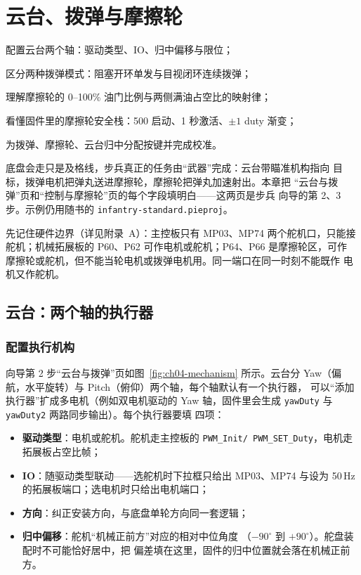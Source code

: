 \chapter{云台、拨弹与摩擦轮}
\label{ch:gimbal}

\begin{introduction}
  \item 配置云台两个轴：驱动类型、IO、归中偏移与限位；
  \item 区分两种拨弹模式：阻塞开环单发与目视闭环连续拨弹；
  \item 理解摩擦轮的 0--100\% 油门比例与两侧满油占空比的映射律；
  \item 看懂固件里的摩擦轮安全栈：500 启动、1 秒激活、$\pm1$ duty 渐变；
  \item 为拨弹、摩擦轮、云台归中分配按键并完成校准。
\end{introduction}

底盘会走只是及格线，步兵真正的任务由“武器”完成：云台带瞄准机构指向
目标，拨弹电机把弹丸送进摩擦轮，摩擦轮把弹丸加速射出。本章把
“云台与拨弹”页和“控制与摩擦轮”页的每个字段填明白——这两页是步兵
向导的第 2、3 步。示例仍用随书的
\texttt{infantry-standard.pieproj}。

先记住硬件边界（详见附录~A）：主控板只有 MP03、MP74 两个舵机口，只能接
舵机；机械拓展板的 P60、P62 可作电机或舵机；P64、P66 是摩擦轮区，可作
摩擦轮或舵机，但不能当轮电机或拨弹电机用。同一端口在同一时刻不能既作
电机又作舵机。

\section{云台：两个轴的执行器}

\subsection{配置执行机构}

向导第 2 步“云台与拨弹”页如图~\ref{fig:ch04-mechanism} 所示。云台分
Yaw（偏航，水平旋转）与 Pitch（俯仰）两个轴，每个轴默认有一个执行器，
可以“添加执行器”扩成多电机（例如双电机驱动的 Yaw 轴，固件里会生成
\texttt{yawDuty} 与 \texttt{yawDuty2} 两路同步输出）。每个执行器要填
四项：

\begin{itemize}
  \item \textbf{驱动类型}：电机或舵机。舵机走主控板的 \texttt{PWM\_Init/
        PWM\_SET\_Duty}，电机走拓展板占空比帧；
  \item \textbf{IO}：随驱动类型联动——选舵机时下拉框只给出 MP03、MP74
        与设为 50\,Hz 的拓展板端口；选电机时只给出电机端口；
  \item \textbf{方向}：纠正安装方向，与底盘单轮方向同一套逻辑；
  \item \textbf{归中偏移}：舵机“机械正前方”对应的相对中位角度
        （$-90^\circ$ 到 $+90^\circ$）。舵盘装配时不可能恰好居中，把
        偏差填在这里，固件的归中位置就会落在机械正前方。
\end{itemize}

